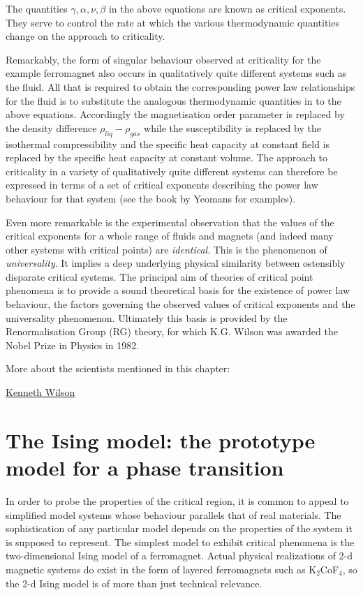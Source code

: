 \documentclass[
  letterpaper,
  enabledeprecatedfontcommands]{report}
\begin{document}
The quantities \(\gamma, \alpha, \nu, \beta\) in the above equations are
known as critical exponents. They serve to control the rate at which the
various thermodynamic quantities change on the approach to criticality.

Remarkably, the form of singular behaviour observed at criticality for
the example ferromagnet also occurs in qualitatively quite different
systems such as the fluid. All that is required to obtain the
corresponding power law relationships for the fluid is to substitute the
analogous thermodynamic quantities in to the above equations.
Accordingly the magnetisation order parameter is replaced by the density
difference \(\rho_{liq}-\rho_{gas}\) while the susceptibility is
replaced by the isothermal compressibility and the specific heat
capacity at constant field is replaced by the specific heat capacity at
constant volume. The approach to criticality in a variety of
qualitatively quite different systems can therefore be expressed in
terms of a set of critical exponents describing the power law behaviour
for that system (see the book by Yeomans for examples).

Even more remarkable is the experimental observation that the values of
the critical exponents for a whole range of fluids and magnets (and
indeed many other systems with critical points) are \emph{identical}.
This is the phenomenon of \emph{universality}. It implies a deep
underlying physical similarity between ostensibly disparate critical
systems. The principal aim of theories of critical point phenomena is to
provide a sound theoretical basis for the existence of power law
behaviour, the factors governing the observed values of critical
exponents and the universality phenomenon. Ultimately this basis is
provided by the Renormalisation Group (RG) theory, for which K.G. Wilson
was awarded the Nobel Prize in Physics in 1982.

More about the scientists mentioned in this chapter:

\href{https://en.wikipedia.org/wiki/Kenneth_G._Wilson}{Kenneth Wilson}

\chapter{The Ising model: the prototype model for a phase
transition}\label{sec:models}

In order to probe the properties of the critical region, it is common to
appeal to simplified model systems whose behaviour parallels that of
real materials. The sophistication of any particular model depends on
the properties of the system it is supposed to represent. The simplest
model to exhibit critical phenomena is the two-dimensional Ising model
of a ferromagnet. Actual physical realizations of 2-d magnetic systems
do exist in the form of layered ferromagnets such as K\(_2\)CoF\(_4\),
so the 2-d Ising model is of more than just technical relevance.
\end{document}
